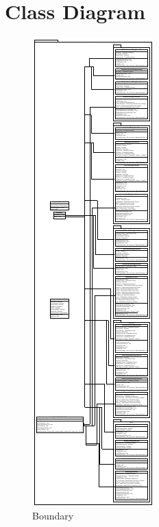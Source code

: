\chapter{Class Diagram}

\begin{figure}[!h]
    \centering
    \includegraphics[page=2,scale=3.2]{pdfs/Boundary.pdf}
    \caption{Boundary}\label{Boundary1}
\end{figure}

